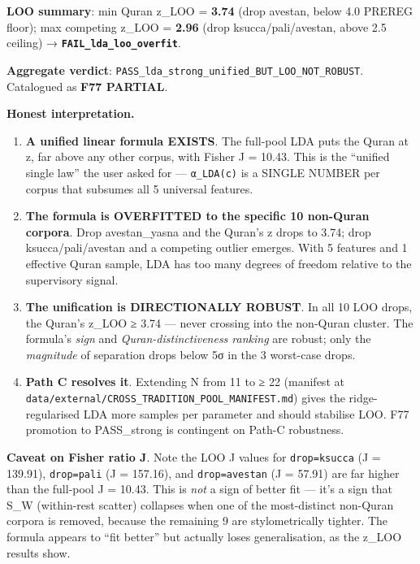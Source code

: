 \documentclass[
]{article}
\providecommand{\tightlist}{%
  \setlength{\itemsep}{0pt}\setlength{\parskip}{0pt}}
\begin{document}
\textbf{LOO summary}: min Quran \textbar z\textbar\_LOO = \textbf{3.74}
(drop avestan, below 4.0 PREREG floor); max competing
\textbar z\textbar\_LOO = \textbf{2.96} (drop ksucca/pali/avestan, above
2.5 ceiling) → \textbf{\texttt{FAIL\_lda\_loo\_overfit}}.

\textbf{Aggregate verdict}:
\texttt{PASS\_lda\_strong\_unified\_BUT\_LOO\_NOT\_ROBUST}. Catalogued
as \textbf{F77 PARTIAL}.

\textbf{Honest interpretation.}

\begin{enumerate}
\def\labelenumi{\arabic{enumi}.}
\tightlist
\item
  \textbf{A unified linear formula EXISTS}. The full-pool LDA puts the
  Quran at \textbar z, far above any other corpus, with
  Fisher J = 10.43. This is the ``unified single law'' the user asked
  for --- \texttt{α\_LDA(c)} is a SINGLE NUMBER per corpus that subsumes
  all 5 universal features.
\item
  \textbf{The formula is OVERFITTED to the specific 10 non-Quran
  corpora}. Drop avestan\_yasna and the Quran's z drops to 3.74; drop
  ksucca/pali/avestan and a competing outlier emerges. With 5 features
  and 1 effective Quran sample, LDA has too many degrees of freedom
  relative to the supervisory signal.
\item
  \textbf{The unification is DIRECTIONALLY ROBUST}. In all 10 LOO drops,
  the Quran's \textbar z\textbar\_LOO ≥ 3.74 --- never crossing into the
  non-Quran cluster. The formula's \emph{sign} and
  \emph{Quran-distinctiveness ranking} are robust; only the
  \emph{magnitude} of separation drops below 5σ in the 3 worst-case
  drops.
\item
  \textbf{Path C resolves it}. Extending N from 11 to ≥ 22 (manifest at
  \texttt{data/external/CROSS\_TRADITION\_POOL\_MANIFEST.md}) gives the
  ridge-regularised LDA more samples per parameter and should stabilise
  LOO. F77 promotion to PASS\_strong is contingent on Path-C robustness.
\end{enumerate}

\textbf{Caveat on Fisher ratio J}. Note the LOO J values for
\texttt{drop=ksucca} (J = 139.91), \texttt{drop=pali} (J = 157.16), and
\texttt{drop=avestan} (J = 57.91) are far higher than the full-pool J =
10.43. This is \emph{not} a sign of better fit --- it's a sign that S\_W
(within-rest scatter) collapses when one of the most-distinct non-Quran
corpora is removed, because the remaining 9 are stylometrically tighter.
The formula appears to ``fit better'' but actually loses generalisation,
as the \textbar z\textbar\_LOO results show.
\end{document}
